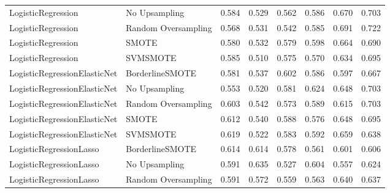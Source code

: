 \begin{tabular}{llllllll}
          LogisticRegression &       No Upsampling & 0.584 &                     0.529 &                 0.562 &                  0.586 &                                   0.670 &     0.703 \\
          LogisticRegression & Random Oversampling & 0.568 &                     0.531 &                 0.542 &                  0.585 &                                   0.691 &     0.722 \\
          LogisticRegression &               SMOTE & 0.580 &                     0.532 &                 0.579 &                  0.598 &                                   0.664 &     0.690 \\
          LogisticRegression &            SVMSMOTE & 0.585 &                     0.510 &                 0.575 &                  0.570 &                                   0.634 &     0.695 \\
LogisticRegressionElasticNet &     BorderlineSMOTE & 0.581 &                     0.537 &                 0.602 &                  0.586 &                                   0.597 &     0.667 \\
LogisticRegressionElasticNet &       No Upsampling & 0.553 &                     0.520 &                 0.581 &                  0.624 &                                   0.648 &     0.703 \\
LogisticRegressionElasticNet & Random Oversampling & 0.603 &                     0.542 &                 0.573 &                  0.589 &                                   0.615 &     0.703 \\
LogisticRegressionElasticNet &               SMOTE & 0.612 &                     0.540 &                 0.588 &                  0.576 &                                   0.648 &     0.695 \\
LogisticRegressionElasticNet &            SVMSMOTE & 0.619 &                     0.522 &                 0.583 &                  0.592 &                                   0.659 &     0.638 \\
     LogisticRegressionLasso &     BorderlineSMOTE & 0.614 &                     0.614 &                 0.578 &                  0.561 &                                   0.601 &     0.606 \\
     LogisticRegressionLasso &       No Upsampling & 0.591 &                     0.635 &                 0.527 &                  0.604 &                                   0.557 &     0.624 \\
     LogisticRegressionLasso & Random Oversampling & 0.591 &                     0.572 &                 0.559 &                  0.563 &                                   0.640 &     0.637 \\

\end{tabular}
